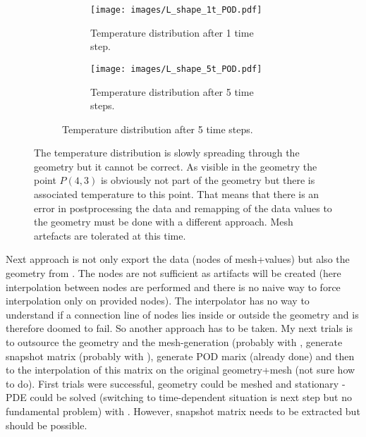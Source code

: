 \documentclass{scrartcl}
\begin{document}
	\begin{figure}[H]
		\begin{figure}[H]
			\begin{minipage}[t]{0.5\linewidth}
				\begin{subfigure}[t]{\linewidth}
					\texttt{[image: images/L\_shape\_1t\_POD.pdf]}
					\caption{Temperature distribution after 1 time step.}
				\end{subfigure}
			\end{minipage}
			\begin{minipage}[t]{0.5\linewidth}
				\begin{subfigure}[t]{\linewidth}
					\texttt{[image: images/L\_shape\_5t\_POD.pdf]}
					\caption{Temperature distribution after 5 time steps.}
				\end{subfigure}
			\end{minipage}
		\end{figure}
		\caption{The temperature distribution is slowly spreading through the geometry but it cannot be correct. As visible in the geometry the point $P(4,3)$ is obviously not part of the geometry but there is associated temperature to this point. That means that there is an error in postprocessing the data and remapping of the data values to the geometry must be done with a different approach. Mesh artefacts are tolerated at this time.}
		\label{}
	\end{figure}
	Next approach is not only export the data (nodes of mesh+values) but also the geometry from \Comsol. The nodes are not sufficient as artifacts will be created (here interpolation between nodes are performed and there is no naive way to \grqq{}force\grqq{} interpolation only on provided nodes). The interpolator has no way to understand if a connection line of nodes lies inside or outside the geometry and is therefore doomed to fail. So another approach has to be taken.
	My next trials is to outsource the geometry and the mesh-generation (probably with \Gmsh, generate snapshot matrix (probably with \Freefempp), generate POD marix (already done) and then to the interpolation of this matrix on the original geometry+mesh (not sure how to do). First trials were successful, \ie geometry could be meshed and stationary \Poisson-PDE could be solved (switching to time-dependent situation is next step but no fundamental problem) with \Freefempp. However, snapshot matrix needs to be extracted but should be possible.
\end{document}
